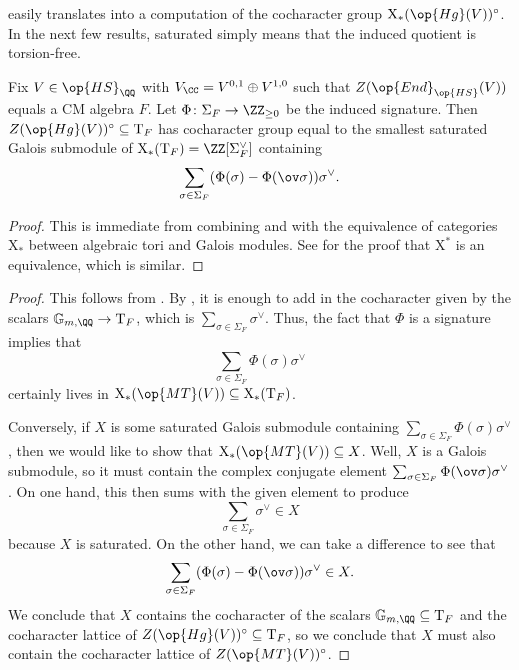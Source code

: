 \documentclass[../thesis.tex]{subfiles}
\begin{document}
 easily translates into a computation of the cocharacter group $\mathrm X_*(\op{Hg}(V))^\circ$. In the next few results, saturated simply means that the induced quotient is torsion-free.
\begin{corollary} \label{cor:compute-z-hg}
	Fix $V\in\op{HS}_\QQ$ with $V_\CC=V^{0,1}\oplus V^{1,0}$ such that $Z(\op{End}_{\op{HS}}(V))$ equals a CM algebra $F$. Let $\Phi\colon\Sigma_F\to\ZZ_{\ge0}$ be the induced signature. Then $Z(\op{Hg}(V))^\circ\subseteq\mathrm T_F$ has cocharacter group equal to the smallest saturated Galois submodule of $\mathrm X_*(\mathrm T_F)=\ZZ[\Sigma_F^\lor]$ containing
	\[\sum_{\sigma\in\Sigma_F}(\Phi(\sigma)-\Phi(\ov\sigma))\sigma^\lor.\]
\end{corollary}
\begin{proof}
	This is immediate from combining  and  with the equivalence of categories $\mathrm X_*$ between algebraic tori and Galois modules. See \cite[Theorem~12.23]{milne-alg-groups} for the proof that $\mathrm X^*$ is an equivalence, which is similar.
\end{proof}
\computezmt
\begin{proof}
	This follows from . By , it is enough to add in the cocharacter given by the scalars $\mathbb G_{m,\QQ}\to\mathrm T_F$, which is $\sum_{\sigma\in\Sigma_F}\sigma^\lor$. Thus, the fact that $\Phi$ is a signature implies that
	\[\sum_{\sigma\in\Sigma_F}\Phi(\sigma)\sigma^\lor\]
	certainly lives in $\mathrm X_*(\op{MT}(V))\subseteq\mathrm X_*(\mathrm T_F)$.
	
	Conversely, if $X$ is some saturated Galois submodule containing $\sum_{\sigma\in\Sigma_F}\Phi(\sigma)\sigma^\lor$, then we would like to show that $\mathrm X_*(\op{MT}(V))\subseteq X$. Well, $X$ is a Galois submodule, so it must contain the complex conjugate element $\sum_{\sigma\in\Sigma_F}\Phi(\ov\sigma)\sigma^\lor$. On one hand, this then sums with the given element to produce
	\[\sum_{\sigma\in\Sigma_F}\sigma^\lor\in X\]
	because $X$ is saturated. On the other hand, we can take a difference to see that
	\[\sum_{\sigma\in\Sigma_F}(\Phi(\sigma)-\Phi(\ov\sigma))\sigma^\lor\in X.\]
	We conclude that $X$ contains the cocharacter of the scalars $\mathbb G_{m,\QQ}\subseteq\mathrm T_F$ and the cocharacter lattice of $Z(\op{Hg}(V))^\circ\subseteq\mathrm T_F$, so we conclude that $X$ must also contain the cocharacter lattice of $Z(\op{MT}(V))^\circ$.
\end{proof}
\end{document}
